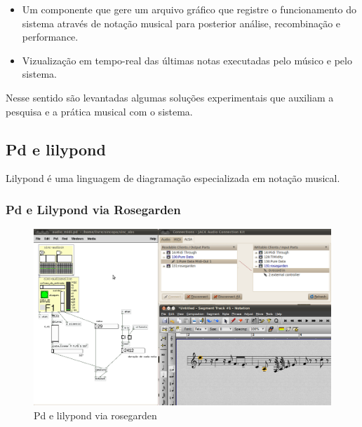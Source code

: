 \documentclass{ppgmus}
\begin{document}
\begin{itemize}
 \item Um componente que gere um arquivo gráfico que registre o funcionamento
do sistema através de notação musical para posterior análise, recombinação e performance.
 \item Vizualização em tempo-real das últimas notas executadas pelo músico e pelo sistema.
\end{itemize}


Nesse sentido são levantadas algumas soluções experimentais que auxiliam a pesquisa e 
a prática musical com o sistema.


\subsection{Pd e lilypond}

Lilypond é uma linguagem de diagramação especializada
em notação musical.



\subsubsection{Pd e Lilypond via Rosegarden}

\begin{figure}[!ht]
\includegraphics[scale=.6]{audio2midi}
\caption{Pd e lilypond via rosegarden}
\label{pdlilypond1}
\end{figure} 
\end{document}
